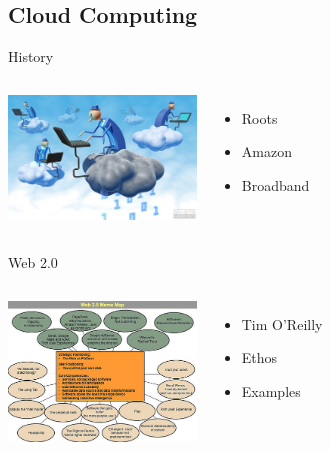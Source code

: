 \documentclass{beamer}
\begin{document}

\subsection{Cloud Computing}

\begin{frame}{History}
\begin{columns}
  \column{5cm}
    \includegraphics[width=5cm]{cloudComputing.jpg}
  \column{5cm}
    \begin{itemize}
    \item Roots
    \item Amazon
    \item Broadband
    \end{itemize}
\end{columns}
\end{frame}

\begin{frame}{Web 2.0}
  \begin{columns}
    \column{5cm}
      \includegraphics[width=5cm]{web20memeMap.jpg}
    \column{5cm}
      \begin{itemize}
      \item Tim O'Reilly
      \item Ethos
      \item Examples
      \end{itemize}
  \end{columns}
\end{frame}
\end{document}
